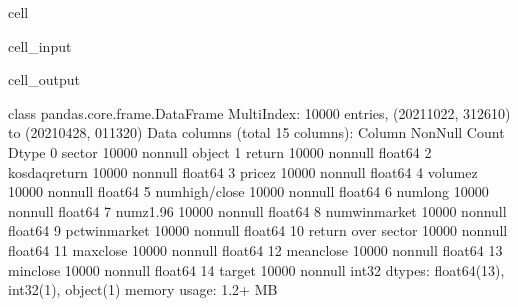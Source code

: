 \documentclass[letterpaper,10pt,english]{jupyterBook}
\begin{document}
\begin{sphinxuseclass}{cell}\begin{sphinxVerbatimInput}

\begin{sphinxuseclass}{cell_input}
\begin{sphinxVerbatim}[commandchars=\\\{\}]
\end{sphinxVerbatim}

\end{sphinxuseclass}\end{sphinxVerbatimInput}
\begin{sphinxVerbatimOutput}

\begin{sphinxuseclass}{cell_output}
\begin{sphinxVerbatim}[commandchars=\\\{\}]
\PYGZlt{}class \PYGZsq{}pandas.core.frame.DataFrame\PYGZsq{}\PYGZgt{}
MultiIndex: 10000 entries, (\PYGZsq{}2021\PYGZhy{}10\PYGZhy{}22\PYGZsq{}, \PYGZsq{}312610\PYGZsq{}) to (\PYGZsq{}2021\PYGZhy{}04\PYGZhy{}28\PYGZsq{}, \PYGZsq{}011320\PYGZsq{})
Data columns (total 15 columns):
 \PYGZsh{}   Column              Non\PYGZhy{}Null Count  Dtype  
\PYGZhy{}\PYGZhy{}\PYGZhy{}  \PYGZhy{}\PYGZhy{}\PYGZhy{}\PYGZhy{}\PYGZhy{}\PYGZhy{}              \PYGZhy{}\PYGZhy{}\PYGZhy{}\PYGZhy{}\PYGZhy{}\PYGZhy{}\PYGZhy{}\PYGZhy{}\PYGZhy{}\PYGZhy{}\PYGZhy{}\PYGZhy{}\PYGZhy{}\PYGZhy{}  \PYGZhy{}\PYGZhy{}\PYGZhy{}\PYGZhy{}\PYGZhy{}  
 0   sector              10000 non\PYGZhy{}null  object 
 1   return              10000 non\PYGZhy{}null  float64
 2   kosdaq\PYGZus{}return       10000 non\PYGZhy{}null  float64
 3   price\PYGZus{}z             10000 non\PYGZhy{}null  float64
 4   volume\PYGZus{}z            10000 non\PYGZhy{}null  float64
 5   num\PYGZus{}high/close      10000 non\PYGZhy{}null  float64
 6   num\PYGZus{}long            10000 non\PYGZhy{}null  float64
 7   num\PYGZus{}z\PYGZgt{}1.96          10000 non\PYGZhy{}null  float64
 8   num\PYGZus{}win\PYGZus{}market      10000 non\PYGZhy{}null  float64
 9   pct\PYGZus{}win\PYGZus{}market      10000 non\PYGZhy{}null  float64
 10  return over sector  10000 non\PYGZhy{}null  float64
 11  max\PYGZus{}close           10000 non\PYGZhy{}null  float64
 12  mean\PYGZus{}close          10000 non\PYGZhy{}null  float64
 13  min\PYGZus{}close           10000 non\PYGZhy{}null  float64
 14  target              10000 non\PYGZhy{}null  int32  
dtypes: float64(13), int32(1), object(1)
memory usage: 1.2+ MB
\end{sphinxVerbatim}

\end{sphinxuseclass}\end{sphinxVerbatimOutput}

\end{sphinxuseclass}
\end{document}

